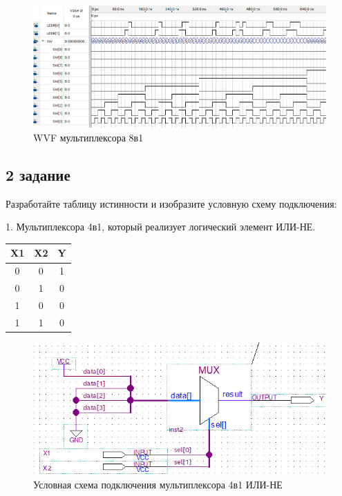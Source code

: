 \documentclass[a4paper,14pt]{article}
\begin{document}
\begin{figure}[H]
	\centering
	\includegraphics[width=0.6\linewidth]{img/dop1_wvf}
	\caption{WVF  мультиплексора 8в1}
	\label{fig:dop1_wvf}
\end{figure}
  
\subsection{2 задание}

Разработайте таблицу истинности и изобразите условную схему
подключения:

1. Мультиплексора 4в1, который реализует логический элемент ИЛИ-НЕ.

\begin{table}[H]
	\begin{center}
		\begin{flushleft}
		\end{flushleft}
		\label{tab:ili_ne}
		\begin{tabular}{|c|c|c|}
			\hline
			X1 & X2 & Y \\ \hline
			0  & 0  & 1 \\ \hline
			0  & 1  & 0 \\ \hline
			1  & 0  & 0 \\ \hline
			1  & 1  & 0 \\ \hline
		\end{tabular}
	\end{center}
\end{table}

\begin{figure}[H]
	\centering
	\includegraphics[width=0.6\linewidth]{img/dop2_sh}
	\caption{Условная схема подключения мультиплексора 4в1 ИЛИ-НЕ}
	\label{fig:dop2_sh}
\end{figure}
\end{document}
